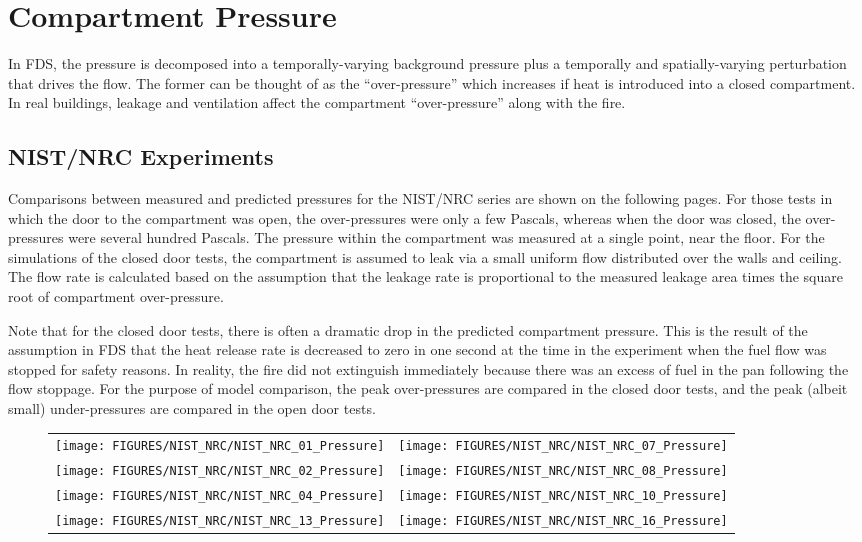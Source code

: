 
\chapter{Compartment Pressure}

In FDS, the pressure is decomposed into a temporally-varying background pressure plus a temporally and spatially-varying perturbation that drives the flow. The former can be thought of as the ``over-pressure'' which increases if heat is introduced into a closed compartment. In real buildings, leakage and ventilation affect the compartment ``over-pressure'' along with the fire.

\section{NIST/NRC Experiments}

Comparisons between measured and predicted pressures for the NIST/NRC series are shown on the following pages. For those tests in which the door to the compartment was open, the over-pressures were only a few Pascals, whereas when the door was closed, the over-pressures were several hundred Pascals. The pressure within the compartment was measured at a single point, near the floor. For the simulations of the closed door tests, the compartment is assumed to leak via a small uniform flow distributed over the walls and ceiling. The flow rate is calculated based on the assumption that the leakage rate is proportional to the measured leakage area times the square root of compartment over-pressure.

Note that for the closed door tests, there is often a dramatic drop in the predicted compartment pressure. This is the result of the assumption in FDS that the heat release rate is decreased to zero in one second at the time in the experiment when the fuel flow was stopped for safety reasons.  In reality, the fire did not extinguish immediately because there was an excess of fuel in the pan following the flow stoppage. For the purpose of model comparison, the peak over-pressures are compared in the closed door tests, and the peak (albeit small) under-pressures are compared in the open door tests.

\newpage

\begin{figure}[p]
\begin{tabular*}{\textwidth}{l@{\extracolsep{\fill}}r}
\texttt{[image: FIGURES/NIST\_NRC/NIST\_NRC\_01\_Pressure]} &
\texttt{[image: FIGURES/NIST\_NRC/NIST\_NRC\_07\_Pressure]} \\
\texttt{[image: FIGURES/NIST\_NRC/NIST\_NRC\_02\_Pressure]} &
\texttt{[image: FIGURES/NIST\_NRC/NIST\_NRC\_08\_Pressure]} \\
\texttt{[image: FIGURES/NIST\_NRC/NIST\_NRC\_04\_Pressure]} &
\texttt{[image: FIGURES/NIST\_NRC/NIST\_NRC\_10\_Pressure]} \\
\texttt{[image: FIGURES/NIST\_NRC/NIST\_NRC\_13\_Pressure]} &
\texttt{[image: FIGURES/NIST\_NRC/NIST\_NRC\_16\_Pressure]}
\end{tabular*}
\label{NIST_NRC_Pressure_Closed}
\end{figure}

